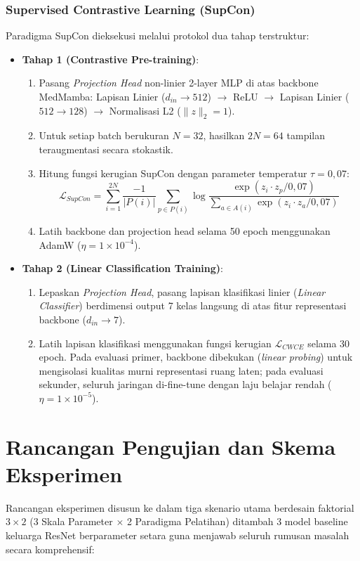 \subsubsection{Supervised Contrastive Learning (SupCon)}
Paradigma SupCon dieksekusi melalui protokol dua tahap terstruktur:
\begin{itemize}[noitemsep]
	\item \textbf{Tahap 1 (Contrastive Pre-training)}:
	\begin{enumerate}[noitemsep]
		\item Pasang \textit{Projection Head} non-linier 2-layer MLP di atas backbone MedMamba: Lapisan Linier ($d_{in} \rightarrow 512$) $\rightarrow$ ReLU $\rightarrow$ Lapisan Linier ($512 \rightarrow 128$) $\rightarrow$ Normalisasi L2 ($\|z\|_2 = 1$).
		\item Untuk setiap batch berukuran $N=32$, hasilkan $2N=64$ tampilan teraugmentasi secara stokastik.
		\item Hitung fungsi kerugian SupCon dengan parameter temperatur $\tau = 0,07$:
		\begin{equation}
			\mathcal{L}_{SupCon} = \sum_{i=1}^{2N} \frac{-1}{|P(i)|} \sum_{p \in P(i)} \log \frac{\exp(z_i \cdot z_p / 0,07)}{\sum_{a \in A(i)} \exp(z_i \cdot z_a / 0,07)}
		\end{equation}
		\item Latih backbone dan projection head selama 50 epoch menggunakan AdamW ($\eta = 1 \times 10^{-4}$).
	\end{enumerate}
	\item \textbf{Tahap 2 (Linear Classification Training)}:
	\begin{enumerate}[noitemsep]
		\item Lepaskan \textit{Projection Head}, pasang lapisan klasifikasi linier (\textit{Linear Classifier}) berdimensi output 7 kelas langsung di atas fitur representasi backbone ($d_{in} \rightarrow 7$).
		\item Latih lapisan klasifikasi menggunakan fungsi kerugian $\mathcal{L}_{CWCE}$ selama 30 epoch. Pada evaluasi primer, backbone dibekukan (\textit{linear probing}) untuk mengisolasi kualitas murni representasi ruang laten; pada evaluasi sekunder, seluruh jaringan di-fine-tune dengan laju belajar rendah ($\eta = 1 \times 10^{-5}$).
	\end{enumerate}
\end{itemize}

\section{Rancangan Pengujian dan Skema Eksperimen} \label{III.RancanganPengujian}
Rancangan eksperimen disusun ke dalam tiga skenario utama berdesain faktorial $3 \times 2$ (3 Skala Parameter $\times$ 2 Paradigma Pelatihan) ditambah 3 model baseline keluarga ResNet berparameter setara guna menjawab seluruh rumusan masalah secara komprehensif:

